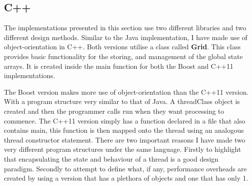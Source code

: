 \documentclass[11pt]{article} %
\begin{document}
\subsection{C++}
The implementations presented in this section use two different libraries and two different design methods. Similar to the Java implementation, I have made use of object-orientation in C++. Both versions utilise a class called {\bf Grid}. This class provides basic functionality for the storing, and management of the global state arrays. It is created inside the main function for both the Boost and C++11 implementations.

The Boost version makes more use of object-orientation than the C++11 version. With a program structure very similar to that of Java. A threadClass object is created and then the programmer calls run when they want processing to commence. The C++11 version simply has a function declared in a file that also contains main, this function is then mapped onto the thread using an analogous thread constructor statement. There are two important reasons I have made two very different program structures under the same language. Firstly to highlight that encapsulating the state and behaviour of a thread is a good design paradigm. Secondly to attempt to define what, if any, performance overheads are created by using a version that has a plethora of objects and one that has only 1. 
\end{document}
